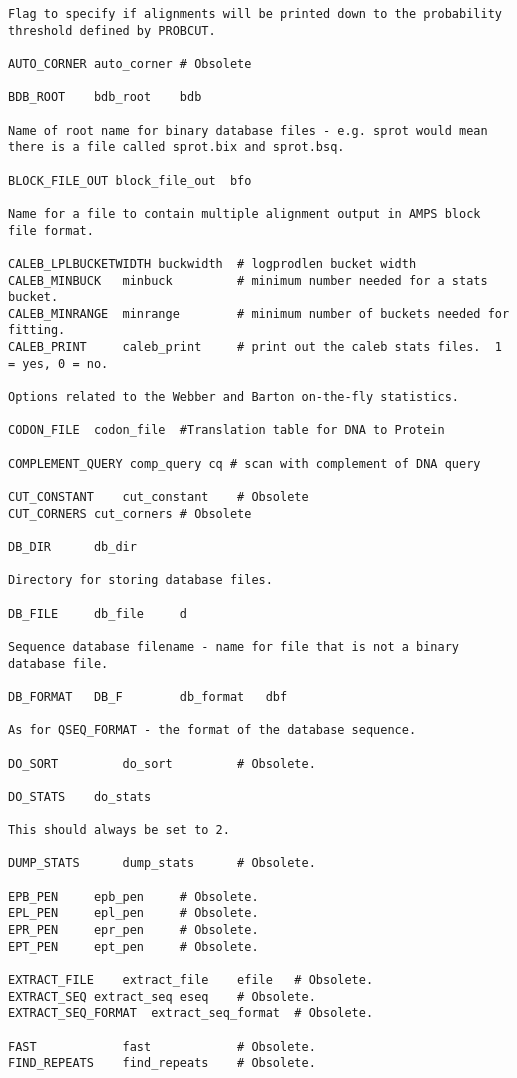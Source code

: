 \documentclass[12pt]{article}
\begin{document}
\begin{scriptsize}
\begin{verbatim}
Flag to specify if alignments will be printed down to the probability
threshold defined by PROBCUT.

AUTO_CORNER	auto_corner	# Obsolete

BDB_ROOT	bdb_root	bdb     

Name of root name for binary database files - e.g. sprot would mean
there is a file called sprot.bix and sprot.bsq.

BLOCK_FILE_OUT block_file_out  bfo 

Name for a file to contain multiple alignment output in AMPS block file format.

CALEB_LPLBUCKETWIDTH buckwidth  # logprodlen bucket width
CALEB_MINBUCK   minbuck         # minimum number needed for a stats bucket.
CALEB_MINRANGE  minrange        # minimum number of buckets needed for fitting.
CALEB_PRINT     caleb_print     # print out the caleb stats files.  1 = yes, 0 = no.

Options related to the Webber and Barton on-the-fly statistics.

CODON_FILE	codon_file	#Translation table for DNA to Protein

COMPLEMENT_QUERY comp_query	cq # scan with complement of DNA query	

CUT_CONSTANT	cut_constant	# Obsolete
CUT_CORNERS	cut_corners	# Obsolete

DB_DIR		db_dir		

Directory for storing database files.

DB_FILE		db_file 	d	

Sequence database filename - name for file that is not a binary database file.

DB_FORMAT	DB_F		db_format	dbf	 

As for QSEQ_FORMAT - the format of the database sequence.

DO_SORT	     	do_sort	        # Obsolete.

DO_STATS	do_stats	

This should always be set to 2.

DUMP_STATS      dump_stats      # Obsolete.

EPB_PEN		epb_pen		# Obsolete.
EPL_PEN		epl_pen		# Obsolete.
EPR_PEN		epr_pen		# Obsolete.
EPT_PEN		ept_pen		# Obsolete.

EXTRACT_FILE	extract_file	efile	# Obsolete.
EXTRACT_SEQ	extract_seq	eseq	# Obsolete.
EXTRACT_SEQ_FORMAT	extract_seq_format	# Obsolete.

FAST            fast            # Obsolete.
FIND_REPEATS	find_repeats	# Obsolete.


\end{verbatim}
\end{scriptsize}
\end{document}
